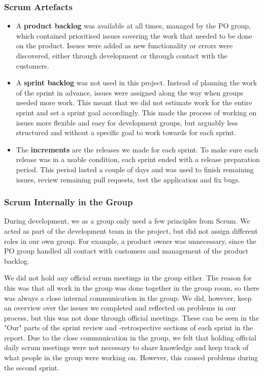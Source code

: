 \subsubsection{Scrum Artefacts}
\begin{itemize}
\item A \textbf{product backlog} was available at all times, managed by the PO group, which contained prioritised issues covering the work that needed to be done on the product. Issues were added as new functionality or errors were discovered, either through development or through contact with the customers.

\item A \textbf{sprint backlog} was not used in this project. Instead of planning the work of the sprint in advance, issues were assigned along the way when groups needed more work. This meant that we did not estimate work for the entire sprint and set a sprint goal accordingly. This made the process of working on issues more flexible and easy for development groups, but arguably less structured and without a specific goal to work towards for each sprint. 

\item The \textbf{increments} are the releases we made for each sprint. To make sure each release was in a usable condition, each sprint ended with a release preparation period. This period lasted a couple of days and was used to finish remaining issues, review remaining pull requests, test the application and fix bugs. 
\end{itemize}

\subsubsection{Scrum Internally in the Group}
During development, we as a group only used a few principles from Scrum. We acted as part of the development team in the project, but did not assign different roles in our own group. For example, a product owner was unnecessary, since the PO group handled all contact with customers and management of the product backlog. 

We did not hold any official scrum meetings in the group either. The reason for this was that all work in the group was done together in the group room, so there was always a close internal communication in the group. We did, however, keep an overview over the issues we completed and reflected on problems in our process, but this was not done through official meetings. 
These can be seen in the "Our" parts of the sprint review and -retrospective sections of each sprint in the report. 
Due to the close communication in the group, we felt that holding official daily scrum meetings were not necessary to share knowledge and keep track of what people in the group were working on. However, this caused problems during the second sprint.

